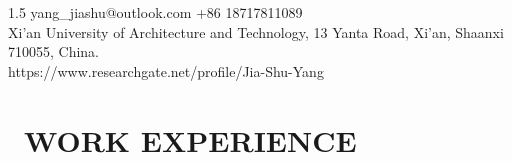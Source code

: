 \documentclass{resume}
\begin{document}

    \vspace{0pt}
    \hspace{-6pt}
    \vspace{8pt}
        
        
    \begin{spacing}{1.5}
        {\faEnvelope}\; yang\_jiashu@outlook.com \qquad \qquad {\faPhone}\; +86 18717811089 \\
        {\faMapMarker*}\; Xi'an University of Architecture and Technology, 13 Yanta Road, Xi'an, Shaanxi 710055, China. \\
        {\faUserTie}\; https://www.researchgate.net/profile/Jia-Shu-Yang
        \vspace{8pt}
    \end{spacing}

\vspace{-12pt}
\section{\faUniversity\ WORK EXPERIENCE}
\end{document}
